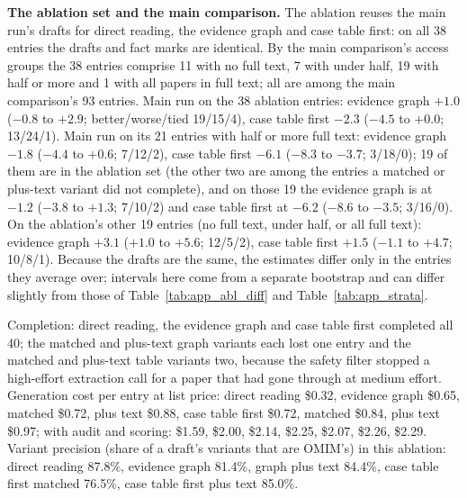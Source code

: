 \documentclass{article} %
\begin{document}
\textbf{The ablation set and the main comparison.} The ablation reuses the main run's drafts for direct reading, the evidence graph and case table first: on all 38 entries the drafts and fact marks are identical. By the main comparison's access groups the 38 entries comprise 11 with no full text, 7 with under half, 19 with half or more and 1 with all papers in full text; all are among the main comparison's 93 entries. Main run on the 38 ablation entries: evidence graph $+1.0$ ($-0.8$ to $+2.9$; better/worse/tied 19/15/4), case table first $-2.3$ ($-4.5$ to $+0.0$; 13/24/1). Main run on its 21 entries with half or more full text: evidence graph $-1.8$ ($-4.4$ to $+0.6$; 7/12/2), case table first $-6.1$ ($-8.3$ to $-3.7$; 3/18/0); 19 of them are in the ablation set (the other two are among the entries a matched or plus-text variant did not complete), and on those 19 the evidence graph is at $-1.2$ ($-3.8$ to $+1.3$; 7/10/2) and case table first at $-6.2$ ($-8.6$ to $-3.5$; 3/16/0). On the ablation's other 19 entries (no full text, under half, or all full text): evidence graph $+3.1$ ($+1.0$ to $+5.6$; 12/5/2), case table first $+1.5$ ($-1.1$ to $+4.7$; 10/8/1). Because the drafts are the same, the estimates differ only in the entries they average over; intervals here come from a separate bootstrap and can differ slightly from those of Table~\ref{tab:app_abl_diff} and Table~\ref{tab:app_strata}.

Completion: direct reading, the evidence graph and case table first completed all 40; the matched and plus-text graph variants each lost one entry and the matched and plus-text table variants two, because the safety filter stopped a high-effort extraction call for a paper that had gone through at medium effort. Generation cost per entry at list price: direct reading \$0.32, evidence graph \$0.65, matched \$0.72, plus text \$0.88, case table first \$0.72, matched \$0.84, plus text \$0.97; with audit and scoring: \$1.59, \$2.00, \$2.14, \$2.25, \$2.07, \$2.26, \$2.29. Variant precision (share of a draft's variants that are OMIM's) in this ablation: direct reading 87.8\%, evidence graph 81.4\%, graph plus text 84.4\%, case table first matched 76.5\%, case table first plus text 85.0\%.
\end{document}
